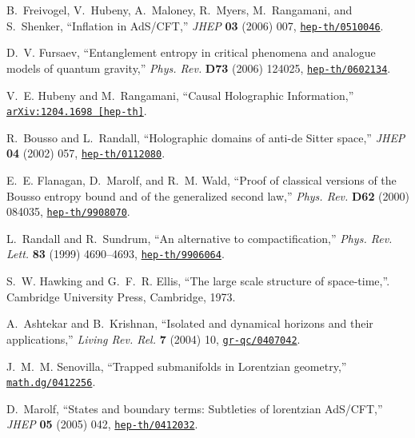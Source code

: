\documentclass[12pt]{article}
\begin{document}
\begin{thebibliography}{10}
B.~Freivogel, V.~Hubeny, A.~Maloney, R.~Myers, M.~Rangamani, and S.~Shenker,
  ``Inflation in AdS/CFT,'' {\em JHEP} {\bf 03} (2006)  007,
  \href{http://arxiv.org/abs/hep-th/0510046}{{\tt hep-th/0510046}}.

D.~V. Fursaev, ``Entanglement entropy in critical phenomena and analogue models
  of quantum gravity,'' {\em Phys. Rev.} {\bf D73} (2006)  124025,
\href{http://arxiv.org/abs/hep-th/0602134}{{\tt hep-th/0602134}}.

V.~E. Hubeny and M.~Rangamani, ``{Causal Holographic Information},''
\href{http://arxiv.org/abs/1204.1698}{{\tt arXiv:1204.1698 [hep-th]}}.

R.~Bousso and L.~Randall, ``Holographic domains of anti-de Sitter space,'' {\em
  JHEP} {\bf 04} (2002)  057,
\href{http://arxiv.org/abs/hep-th/0112080}{{\tt hep-th/0112080}}.

E.~E. Flanagan, D.~Marolf, and R.~M. Wald, ``Proof of classical versions of the
  Bousso entropy bound and of the generalized second law,'' {\em Phys. Rev.}
  {\bf D62} (2000)  084035,
\href{http://arxiv.org/abs/hep-th/9908070}{{\tt hep-th/9908070}}.

L.~Randall and R.~Sundrum, ``An alternative to compactification,'' {\em Phys.
  Rev. Lett.} {\bf 83} (1999)  4690--4693,
\href{http://arxiv.org/abs/hep-th/9906064}{{\tt hep-th/9906064}}.

S.~W. Hawking and G.~F.~R. Ellis, ``The large scale structure of space-time,''.
  Cambridge University Press, Cambridge, 1973.

A.~Ashtekar and B.~Krishnan, ``Isolated and dynamical horizons and their
  applications,'' {\em Living Rev. Rel.} {\bf 7} (2004)  10,
\href{http://arxiv.org/abs/gr-qc/0407042}{{\tt gr-qc/0407042}}.

J.~M.~M. Senovilla, ``Trapped submanifolds in Lorentzian geometry,''
\href{http://arxiv.org/abs/math.dg/0412256}{{\tt math.dg/0412256}}.

D.~Marolf, ``States and boundary terms: Subtleties of lorentzian AdS/CFT,''
  {\em JHEP} {\bf 05} (2005)  042,
\href{http://arxiv.org/abs/hep-th/0412032}{{\tt hep-th/0412032}}.


\end{thebibliography}
\end{document}
